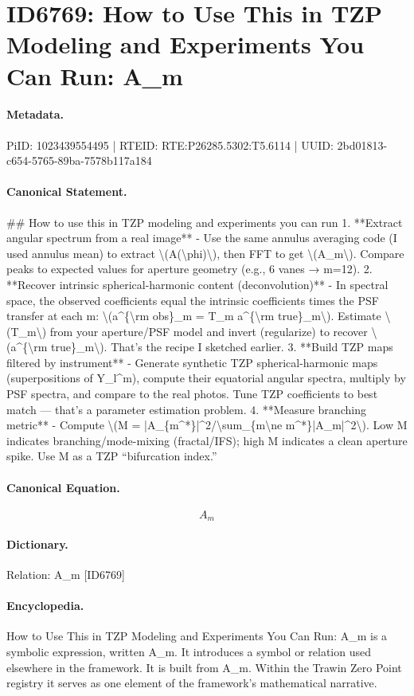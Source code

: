 \section*{ID6769: How to Use This in TZP Modeling and Experiments You Can Run: A\_m}
\paragraph{Metadata.}
PiID: 1023439554495 | RTEID: RTE:P26285.5302:T5.6114 | UUID: 2bd01813-c654-5765-89ba-7578b117a184

\paragraph{Canonical Statement.}
\#\# How to use this in TZP modeling and experiments you can run 1. **Extract angular spectrum from a real image** - Use the same annulus averaging code (I used annulus mean) to extract \textbackslash{}(A(\textbackslash{}phi)\textbackslash{}), then FFT to get \textbackslash{}(A\_m\textbackslash{}). Compare peaks to expected values for aperture geometry (e.g., 6 vanes → m=12). 2. **Recover intrinsic spherical-harmonic content (deconvolution)** - In spectral space, the observed coefficients equal the intrinsic coefficients times the PSF transfer at each m: \textbackslash{}(a\textasciicircum{}\{\textbackslash{}rm obs\}\_m = T\_m a\textasciicircum{}\{\textbackslash{}rm true\}\_m\textbackslash{}). Estimate \textbackslash{}(T\_m\textbackslash{}) from your aperture/PSF model and invert (regularize) to recover \textbackslash{}(a\textasciicircum{}\{\textbackslash{}rm true\}\_m\textbackslash{}). That’s the recipe I sketched earlier. 3. **Build TZP maps filtered by instrument** - Generate synthetic TZP spherical-harmonic maps (superpositions of Y\_l\textasciicircum{}m), compute their equatorial angular spectra, multiply by PSF spectra, and compare to the real photos. Tune TZP coefficients to best match — that’s a parameter estimation problem. 4. **Measure branching metric** - Compute \textbackslash{}(M = |A\_\{m\textasciicircum{}*\}|\textasciicircum{}2/\textbackslash{}sum\_\{m\textbackslash{}ne m\textasciicircum{}*\}|A\_m|\textasciicircum{}2\textbackslash{}). Low M indicates branching/mode-mixing (fractal/IFS); high M indicates a clean aperture spike. Use M as a TZP “bifurcation index.”

\paragraph{Canonical Equation.}
\[
A_m
\]

\paragraph{Dictionary.}
Relation: A\_m [ID6769]

\paragraph{Encyclopedia.}
How to Use This in TZP Modeling and Experiments You Can Run: A\_m is a symbolic expression, written A\_m. It introduces a symbol or relation used elsewhere in the framework. It is built from A\_m. Within the Trawin Zero Point registry it serves as one element of the framework's mathematical narrative.
